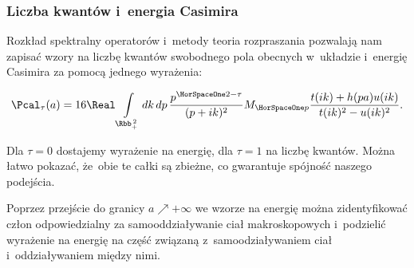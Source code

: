 \documentclass[10pt,t]{beamer}
\begin{document}
\begin{frame}
  \frametitle{Liczba kwantów i~energia Casimira}


  Rozkład spektralny operatorów i~metody teoria rozpraszania pozwalają nam
  zapisać wzory na liczbę kwantów swobodnego pola obecnych w~układzie
  i~energię Casimira
  za pomocą jednego wyrażenia:

  \vspace{-1.1em}



  \begin{equation}
    \label{eq:Pole-skalarne-ETC-04}
    \Pcal_{ \tau }( a ) =
    16 \Real \int\limits_{ \Rbb_{ + }^{ \, 2 } } dk \, dp \,
    \frac{ p^{ \HorSpaceOne 2 - \tau } }{ ( p + i k )^{ 2 } } M_{ \HorSpaceOne p }
    \frac{ t( i k ) + h( p a ) u( i k ) }{ t( i k )^{ 2 } - u( i k )^{ 2 } }.
  \end{equation}

  \vspace{-1.3em}



  Dla $\tau = 0$ dostajemy wyrażenie na energię, dla $\tau = 1$ na liczbę
  kwantów. Można łatwo pokazać, że~obie te całki są zbieżne, co gwarantuje
  spójność naszego podejścia.

  Poprzez przejście do granicy $a \nearrow +\infty$ we wzorze na energię można
  zidentyfikować człon odpowiedzialny za samooddziaływanie ciał
  makroskopowych i~podzielić wyrażenie na energię na część związaną
  z~samoodziaływaniem ciał i~oddziaływaniem między nimi.

\end{frame}
\end{document}
